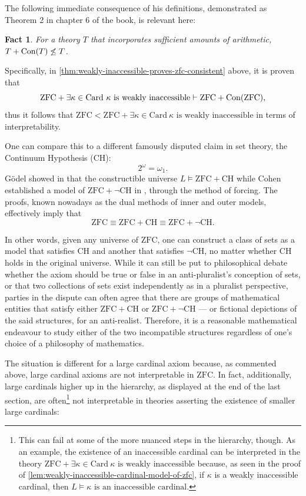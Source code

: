 \documentclass[12pt]{article}
\theoremstyle{plain}
\newtheorem*{fact*}{Fact}
\theoremstyle{definition}
\newcommand{\ZFC}{\mathrm{ZFC}}
\newcommand{\Card}{\mathrm{Card}}
\newcommand{\CH}{\mathrm{CH}}
\DeclareMathOperator{\Con}{Con}
\begin{document}
The following immediate consequence of his definitions, demonstrated as Theorem 2 in chapter 6 of the book, is relevant here:

\begin{fact*}
	For a theory $T$ that incorporates sufficient amounts of arithmetic, $T + \Con\mleft(T\mright) \not\leq T$.
\end{fact*}

Specifically, in \autoref{thm:weakly-inaccessible-proves-zfc-consistent} above, it is proven that
\[\ZFC + \exists \kappa \in \Card \ \text{$\kappa$ is weakly inaccessible} \vdash \ZFC + \Con\mleft(\ZFC\mright),\]
thus it follows that $\ZFC < \ZFC + \exists \kappa \in \Card \ \text{$\kappa$ is weakly inaccessible}$ in terms of interpretability.

One can compare this to a different famously disputed claim in set theory, the Continuum Hypothesis ($\CH$):
\[2^\omega = \omega_1.\]
G\"odel showed in \cite{godel-ch} that the constructible universe $L \vDash \ZFC + \CH$ while Cohen established a model of $\ZFC + \neg \CH$ in \cite{cohen-ch-1}, \cite{cohen-ch-2} through the method of forcing. The proofs, known nowadays as the dual methods of inner and outer models, effectively imply that
\[\ZFC \equiv \ZFC + \CH \equiv \ZFC + \neg \CH.\]

In other words, given any universe of $\ZFC$, one can construct a class of sets as a model that satisfies $\CH$ and another that satisfies $\neg \CH$, no matter whether $\CH$ holds in the original universe. While it can still be put to philosophical debate whether the axiom should be true or false in an anti-pluralist's conception of sets, or that two collections of sets exist independently as in a pluralist perspective, parties in the dispute can often agree that there are groups of mathematical entities that satisfy either $\ZFC + \CH$ or $\ZFC + \neg \CH$ --- or fictional depictions of the said structures, for an anti-realist. Therefore, it is a reasonable mathematical endeavour to study either of the two incompatible structures regardless of one's choice of a philosophy of mathematics.

The situation is different for a large cardinal axiom because, as commented above, large cardinal axioms are not interpretable in $\ZFC$. In fact, additionally, large cardinals higher up in the hierarchy, as displayed at the end of the last section, are often\footnote{This can fail at some of the more nuanced steps in the hierarchy, though. As an example, the existence of an inaccessible cardinal can be interpreted in the theory $\ZFC + \exists \kappa \in \Card \ \text{$\kappa$ is weakly inaccessible}$ because, as seen in the proof of \autoref{lem:weakly-inaccessible-cardinal-model-of-zfc}, if $\kappa$ is a weakly inaccessible cardinal, then $L \vDash \text{$\kappa$ is an inaccessible cardinal}$.} not interpretable in theories asserting the existence of smaller large cardinals:
\end{document}
